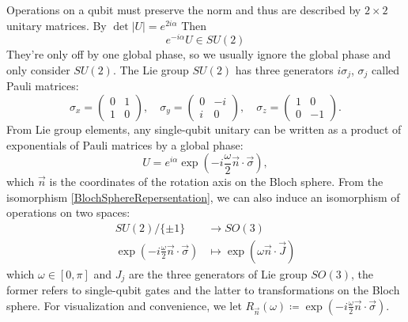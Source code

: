 \documentclass[a4paper,10pt]{book}
\numberwithin{equation}{section}
\begin{document}
Operations on a qubit must preserve the norm and thus are described by $2\times2$ unitary matrices. By $\det|U|=e^{2i\alpha}$ Then
\begin{equation}
    e^{-i\alpha}U\in SU(2)
\end{equation}
They're only off by one global phase, so we usually ignore the global phase and only consider $SU(2)$. The Lie group $SU(2)$ has three generators $i\sigma_j$, $\sigma_j$ called Pauli matrices:
\begin{equation}
    \sigma_x = \begin{pmatrix} 0 & 1 \\ 1 & 0 \end{pmatrix}, \quad
    \sigma_y = \begin{pmatrix} 0 & -i \\ i & 0 \end{pmatrix}, \quad
    \sigma_z = \begin{pmatrix} 1 & 0 \\ 0 & -1 \end{pmatrix}.
\end{equation}
From Lie group elements, any single-qubit unitary can be written as a product of exponentials of Pauli matrices by a global phase:
\begin{equation}
    U = e^{i\alpha}\exp\left(-i\frac{\omega}{2}\vec{n}\cdot\vec{\sigma}\right),
\end{equation}
which $\vec{n}$ is the coordinates of the rotation axis on the Bloch sphere.
From the isomorphism \ref{BlochSphereRepersentation}, we can also induce an isomorphism of operations on two spaces:
\begin{equation}
    \begin{split}
        SU(2)/\{\pm 1\}                                             & \to SO(3)
        \\
        \exp\left(-i\frac{\omega}{2}\vec{n}\cdot\vec{\sigma}\right) & \mapsto \exp\left(\omega\vec{n}\cdot\vec{J}\right)
    \end{split}
\end{equation}
which $\omega\in\left[0,\pi\right]$ and $J_{j}$ are the three generators of Lie group $SO(3)$, the former refers to single-qubit gates and the latter to transformations on the Bloch sphere. For visualization and convenience, we let $R_{\vec{n}}(\omega) \coloneqq \exp\left(-i\frac{\omega}{2}\vec{n}\cdot\vec{\sigma}\right)$.
\end{document}
